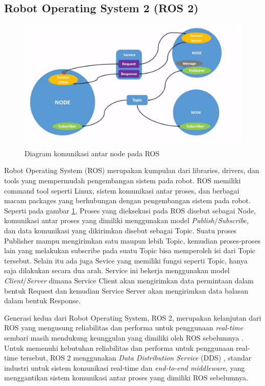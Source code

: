 \subsection{Robot Operating System 2 (ROS 2)}

\begin{figure} [ht] \centering
	\includegraphics[scale=0.45]{gambar/ros-communication.png}
	\caption{Diagram komunikasi antar node pada ROS}
	\label{fig:RosCommunication}
\end{figure}

Robot Operating System (ROS) \citep{Quigley2009} merupakan kumpulan dari libraries, drivers, dan tools yang mempermudah pengembangan sistem pada robot.
ROS memiliki command tool seperti Linux, sistem komunikasi antar proses, dan berbagai macam packages yang berhubungan dengan pengembangan sistem pada robot.
Seperti pada gambar \ref{fig:RosCommunication}, Proses yang dieksekusi pada ROS disebut sebagai Node, komunikasi antar proses yang dimiliki menggunakan model \emph{Publish}/\emph{Subscribe}, dan data komunikasi yang dikirimkan disebut sebagai Topic.
Suatu proses Publisher mampu mengirimkan satu maupun lebih Topic, kemudian proses-proses lain yang melakukan subscribe pada suatu Topic bisa memperoleh isi dari Topic tersebut.
Selain itu ada juga Sevice yang memiliki fungsi seperti Topic, hanya saja dilakukan secara dua arah.
Service ini bekerja menggunakan model \emph{Client}/\emph{Server} dimana Service Client akan mengirimkan data permintaan dalam bentuk Request dan kemudian Service Server akan mengirimkan data balasan dalam bentuk Response.

Generasi kedua dari Robot Operating System, ROS 2, merupakan kelanjutan dari ROS yang mengusung reliabilitas dan performa untuk penggunaan \emph{real-time} sembari masih mendukung keunggulan yang dimiliki oleh ROS sebelumnya \citep{Maruyama2016}.
Untuk memenuhi kebutuhan reliabilitas dan performa untuk penggunaan real-time tersebut, ROS 2 menggunakan \emph{Data Distribution Service} (DDS) \citep{Castellote2003} \citep{Schlesselman2004}, standar industri untuk sistem komunikasi real-time dan \emph{end-to-end middleware}, yang menggantikan sistem komunikasi antar proses yang dimiliki ROS sebelumnya.

